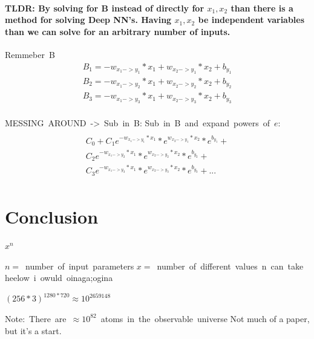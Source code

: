 \documentclass{article}
\begin{document}
\paragraph{TLDR: By solving for B instead of directly for $x_1, x_2$ than there is a method for solving Deep NN's. Having $x_1, x_2$ be independent
variables than we can solve for an arbitrary number of inputs.\newline} 

\hbox{Remmeber B}
\begin{multline}
    B_1 = -w_{x_1->y_1} * x_1 + w_{x_2->y_1} * x_2 + b_{y_1}\\
    B_2 = -w_{x_1->y_2} * x_1 + w_{x_2->y_2} * x_2 + b_{y_2}\\
    B_3 = -w_{x_1->y_3} * x_1 + w_{x_2->y_3} * x_2 + b_{y_3}\\
\end{multline}

\hbox{MESSING AROUND -> Sub in B:}
\hbox{Sub in B and expand powers of $e$:}
\begin{multline}\\
    C_0 + 
    C_1e^{-w_{x_1->y_1} * x_1}*e^{w_{x_2->y_1} * x_2}*e^{b_{y_1}} + \\
    C_2e^{-w_{x_1->y_2} * x_1}*e^{w_{x_2->y_2} * x_2}*e^{b_{y_2}} + \\
    C_3e^{-w_{x_1->y_3} * x_1}*e^{ w_{x_2->y_3} * x_2}*e^{b_{y_3}} + ... \\
\end{multline}




\section{Conclusion}

$x^n$

\hbox{$n =$ number of input parameters}
\hbox{$x =$ number of different values n can take}
\hbox{heelow i owuld oinaga;ogina}


$(256*3)^{1280*720} \approx 10^{2659148}$

\hbox{Note: There are $\approx 10^{82}$ atoms in the observable universe}
Not much of a paper, but it's a start.
\end{document}
